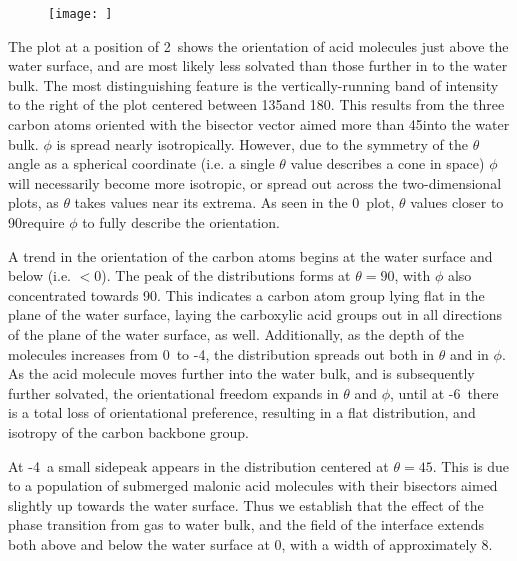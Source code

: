 \begin{figure}[h!]
	\begin{center}
		\texttt{[image: ]}
		\caption{}
		\label{fig:backbone-theta-phi}
	\end{center}
\end{figure}

The plot at a position of 2\angs~shows the orientation of acid molecules just above the water surface, and are most likely less solvated than those further in to the water bulk. The most distinguishing feature is the vertically-running band of intensity to the right of the plot centered between 135\textdegree and 180\textdegree. This results from the three carbon atoms oriented with the bisector vector aimed more than 45\textdegree into the water bulk. $\phi$ is spread nearly isotropically. However, due to the symmetry of the $\theta$ angle as a spherical coordinate (i.e. a single $\theta$ value describes a cone in space) $\phi$ will necessarily become more isotropic, or spread out across the two-dimensional plots, as $\theta$ takes values near its extrema. As seen in the 0\angs~plot, $\theta$ values closer to 90\textdegree require $\phi$ to fully describe the orientation.

A trend in the orientation of the carbon atoms begins at the water surface and below (i.e. $<0$\angs). The peak of the distributions forms at $\theta=90$\textdegree, with $\phi$ also concentrated towards 90\textdegree. This indicates a carbon atom group lying flat in the plane of the water surface, laying the carboxylic acid groups out in all directions of the plane of the water surface, as well. Additionally, as the depth of the molecules increases from 0\angs~to -4\angs, the distribution spreads out both in $\theta$ and in $\phi$. As the acid molecule moves further into the water bulk, and is subsequently further solvated, the orientational freedom expands in $\theta$ and $\phi$, until at -6\angs~there is a total loss of orientational preference, resulting in a flat distribution, and isotropy of the carbon backbone group.

At -4\angs~a small sidepeak appears in the distribution centered at $\theta=45$\textdegree. This is due to a population of submerged malonic acid molecules with their bisectors aimed slightly up towards the water surface. Thus we establish that the effect of the phase transition from gas to water bulk, and the field of the interface extends both above and below the water surface at 0\angs, with a width of approximately 8\angs.



